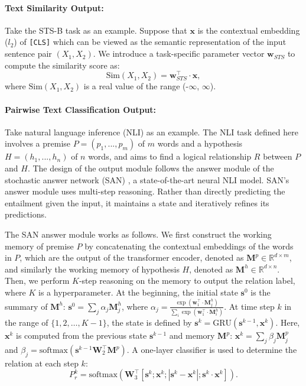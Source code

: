 \paragraph{Text Similarity Output:}
Take the STS-B task as an example. Suppose that $\mathbf{x}$ is the contextual embedding ($l_2$) of \texttt{[CLS]} which can be viewed as the semantic representation of the input sentence pair $(X_1, X_2)$. We introduce a task-specific parameter vector $\mathbf{w}_{STS}$ to compute the similarity score as: 
\begin{equation}
\text{Sim} (X_1, X_2)= \mathbf{w}_{STS}^\top \cdot \mathbf{x},
\label{eqn:text-sim}
\end{equation}
where $\text{Sim} (X_1, X_2)$ is a real value of the range (-$\infty$, $\infty$).


\paragraph{Pairwise Text Classification Output:}
Take natural language inference (NLI) as an example. The NLI task defined here involves a premise $P = (p_1,...,p_m)$ of $m$ words and a hypothesis $H = (h_1,..., h_n)$  of $n$ words, and aims to find a logical relationship $R$ between $P$ and $H$. The design of the output module follows the answer module of the stochastic answer network (SAN) \citep{liu2018san4nli}, a state-of-the-art neural NLI model. SAN's answer module uses multi-step reasoning. Rather than directly predicting the entailment given the input, it maintains a state and iteratively refines its predictions.

The SAN answer module works as follows. We first construct the working memory of premise $P$ by concatenating the contextual embeddings of the words in $P$, which are the output of the transformer encoder, denoted as $\mathbf{M}^p \in \mathbb{R}^{d \times m}$, and similarly the working memory of hypothesis $H$, denoted as $\mathbf{M}^h \in \mathbb{R}^{d \times n}$. 
Then, we perform $K$-step reasoning on the memory to output the relation label, where $K$ is a hyperparameter.
At the beginning,  the initial state $\mathbf{s}^0$ is the summary of $\mathbf{M}^h$: 
$\mathbf{s}^0 = \sum_j \alpha_j\mathbf{M}_j^h$, 
where $\alpha_j = \frac {\exp(\mathbf{w}_1^\top \cdot \mathbf{M}_j^h)} {\sum_i \exp(\mathbf{w}_1^\top \cdot \mathbf{M}_i^h)}$. 
At time step $k$ in the range of $\{1,2,…,K-1\}$, the state is defined by 
$\mathbf{s}^k = \text{GRU} (\mathbf{s}^{k-1}, \mathbf{x}^k)$. 
Here, $\mathbf{x}^k$ is computed from the previous state $\mathbf{s}^{k-1}$ and memory $\mathbf{M}^p$: $\mathbf{x}^k = \sum_j \beta_j\mathbf{M}_j^p$ and $\beta_j = \text{softmax} (\mathbf{s}^{k-1} \mathbf{W}_2^\top \mathbf{M}^p )$. 
A one-layer classifier is used to determine the relation at each step $k$:
\begin{equation}
P_r^k = \text{softmax} (\mathbf{W}_3^\top [\mathbf{s}^k ; \mathbf{x}^k ; |\mathbf{s}^k - \mathbf{x}^k|; \mathbf{s}^k \cdot \mathbf{x}^k ]).
\label{eqn:pairwise-text-classification}
\end{equation}
 
